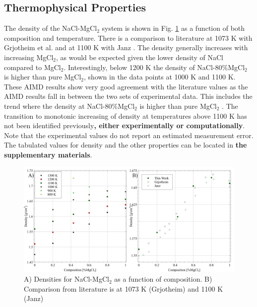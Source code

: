 \documentclass[review]{elsarticle}
\providecommand{\DIFaddtex}[1]{{\bf #1}} %
\providecommand{\DIFdeltex}[1]{} %
\providecommand{\DIFaddbegin}{\protect\color{blue}} %
\providecommand{\DIFaddend}{\protect\color{black}} %
\providecommand{\DIFdelbegin}{\protect\color{red}} %
\providecommand{\DIFdelend}{\protect\color{black}} %
\providecommand{\DIFadd}[1]{\texorpdfstring{\DIFaddtex{#1}}{#1}} %
\providecommand{\DIFdel}[1]{\texorpdfstring{\DIFdeltex{#1}}{}} %
\newcommand{\DIFscaledelfig}{0.5}
\newlength{\DIFdelgraphicswidth} %
\newlength{\DIFdelgraphicsheight} %
\newcommand{\DIFaddincludegraphics}[2][]{{\color{blue}\fbox{\DIFOincludegraphics[#1]{#2}}}} %
\newcommand{\DIFdelincludegraphics}[2][]{%
\sbox{\DIFdelgraphicsbox}{\DIFOincludegraphics[#1]{#2}}%
\settoboxwidth{\DIFdelgraphicswidth}{\DIFdelgraphicsbox} %
\settoboxtotalheight{\DIFdelgraphicsheight}{\DIFdelgraphicsbox} %
\scalebox{\DIFscaledelfig}{%
\parbox[b]{\DIFdelgraphicswidth}{\usebox{\DIFdelgraphicsbox}\\[-\baselineskip] \rule{\DIFdelgraphicswidth}{0em}}\llap{\resizebox{\DIFdelgraphicswidth}{\DIFdelgraphicsheight}{%
\setlength{\unitlength}{\DIFdelgraphicswidth}%
\begin{picture}(1,1)%
\thicklines\linethickness{2pt} %
{\color[rgb]{1,0,0}\put(0,0){\framebox(1,1){}}}%
{\color[rgb]{1,0,0}\put(0,0){\line( 1,1){1}}}%
{\color[rgb]{1,0,0}\put(0,1){\line(1,-1){1}}}%
\end{picture}%
}\hspace*{3pt}}} %
} %
\DeclareRobustCommand{\DIFaddbegin}{\DIFOaddbegin \let\includegraphics\DIFaddincludegraphics} %
\DeclareRobustCommand{\DIFaddend}{\DIFOaddend \let\includegraphics\DIFOincludegraphics} %
\DeclareRobustCommand{\DIFdelbegin}{\DIFOdelbegin \let\includegraphics\DIFdelincludegraphics} %
\DeclareRobustCommand{\DIFdelend}{\DIFOaddend \let\includegraphics\DIFOincludegraphics} %
\begin{document}
\DIFaddend \subsection{Thermophysical Properties}
The density of the NaCl-MgCl$_2$ system is shown in Fig. \ref{fig:density} as a function of both composition and temperature. There is a comparison to literature at 1073 K with Grjotheim et al. \cite{grjotheim1971} and at 1100 K with Janz \cite{Janz1988}. The density generally increases with increasing MgCl$_2$, as would be expected given the lower density of NaCl compared to MgCl$_2$. Interestingly, below 1200 K the density of NaCl-80\%MgCl$_2$ is higher than pure MgCl$_2$, shown in the data points at 1000 K and 1100 K. These AIMD results show very good agreement with the literature values as the AIMD results fall in between the two sets of experimental data. This includes the trend where the density at NaCl-80\%MgCl$_2$ is higher than pure MgCl$_2$ \cite{grjotheim1971}. The transition to monotonic increasing of density at temperatures above 1100 K has not been identified previously\DIFaddbegin \DIFadd{, either experimentally or computationally}\DIFaddend . Note that the experimental values do not report an estimated measurement error. The tabulated values for density and the other properties can be located in \DIFdelbegin \DIFdel{Appendix A}\DIFdelend \DIFaddbegin \DIFadd{the supplementary materials}\DIFaddend .
\begin{figure}[h]
 \centering
 \includegraphics[width=1.0\textwidth]{density_combined_figures.jpg} 
 \caption{A) Densities for NaCl-MgCl$_2$ as a function of composition. B) Comparison from literature is at 1073 K (Grjotheim) \cite{grjotheim1971} and 1100 K (Janz) \cite{Janz1988}}
 \label{fig:density}
\end{figure} 
\end{document}
